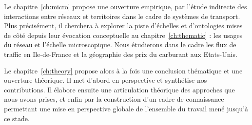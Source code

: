 Le chapitre~\ref{ch:micro} propose une ouverture empirique, par l'étude indirecte des interactions entre réseaux et territoires dans le cadre de systèmes de transport. Plus précisément, il cherchera à explorer la piste d'échelles et d'ontologies mises de côté depuis leur évocation conceptuelle au chapitre~\ref{ch:thematic} : les usages du réseau et l'échelle microscopique. Nous étudierons dans le cadre les flux de traffic en Ile-de-France et la géographie des prix du carburant aux Etats-Unis.

Le chapitre~\ref{ch:theory} propose alors à la fois une conclusion thématique et une ouverture théorique. Il met d'abord en perspective et synthétise nos contributions. Il élabore ensuite une articulation théorique des approches que nous avons prises, et enfin par la construction d'un cadre de connaissance permettant une mise en perspective globale de l'ensemble du travail mené jusqu'à ce stade.



\stars

























